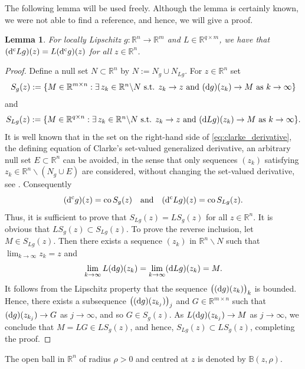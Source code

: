\documentclass[a4paper,11pt]{article}
\newcommand{\B}{\mathbb B}
\newcommand{\R}{\mathbb R}
\numberwithin{equation}{section}
\numberwithin{figure}{section}
\numberwithin{table}{section}
\newtheorem{lemma}[theorem]{Lemma}
\begin{document}
The following lemma will be used freely. Although the lemma is certainly known, we were not able to find a reference, and hence, we will give a proof.
\begin{lemma}\label{lem:Lg}
For locally Lipschitz $g:\R^n\to\R^m$ and $L\in\R^{q\times m}$, we have that
$({\rm d}^{\rm c}Lg)(z)=L({\rm d}^{\rm c}g)(z)$ for all $z\in\R^n$.
\end{lemma}
%
\begin{proof} Define a null set $N\subset\R^n$ by $N:=N_g\cup N_{Lg}$. For $z\in\R^n$ set
\[
S_g(z):=\{M\in\R^{m\times n}:\mbox{$\exists\,z_k\in\R^n\backslash N$ s.t.
$z_k\to z$ and $({\rm d}g)(z_k)\to M$ as $k\to\infty$}\}
\]
and
\[
S_{Lg}(z):=\{M\in\R^{q\times n}:\mbox{$\exists\,z_k\in\R^n\backslash N$ s.t.
$z_k\to z$ and $({\rm d}Lg)(z_k)\to M$ as $k\to\infty$}\}.
\]
It is well known that in the set on the right-hand side of \eqref{eq:clarke_derivative},
the defining equation of Clarke's set-valued generalized derivative,
an arbitrary null set $E\subset\R^n$ can be avoided, in the sense that only sequences
$(z_k)$ satisfying $z_k\in\R^n\backslash (N_g\cup E)$ are considered, without changing
the set-valued derivative, see \cite[Theorem 8.1, Chapter 2 and p.\ 133]{clsw98}. Consequently
\[
({\rm d}^{\rm c}g)(z)={\rm co}\,S_g(z)\quad\mbox{and}\quad({\rm d}^{\rm c}Lg)(z)={\rm co}\,S_{Lg}(z).
\]
Thus, it is sufficient to prove that $S_{Lg}(z)=LS_g(z)$ for all $z\in\R^n$. It is obvious that
$LS_g(z)\subset S_{Lg}(z)$. To prove the reverse inclusion, let $M\in S_{Lg}(z)$. Then there exists
a sequence $(z_k)$ in $\R^n\backslash N$ such that $\lim_{k\to\infty}z_k=z$ and
\[
\lim_{k\to\infty}L({\rm d}g)(z_k)=\lim_{k\to\infty}({\rm d}Lg)(z_k)=M.
\]
It follows from the Lipschitz property that the sequence $\big(({\rm d}g)(z_k)\big)_k$ is bounded. Hence, there exists a subsequence $\big(({\rm d}g)(z_{k_j})\big)_j$ and $G\in\R^{m\times n}$ such that
$({\rm d}g)(z_{k_j})\to G$ as $j\to\infty$, and so $G\in S_g(z)$. As $L({\rm d}g)(z_{k_j})\to M$
as $j\to\infty$, we conclude that $M=LG\in LS_g(z)$, and hence, $S_{Lg}(z)\subset LS_g(z)$, completing the proof.
\end{proof}
%
The open ball in $\R^n$ of radius $\rho>0$ and centred at $z$ is denoted by
$\B(z,\rho)$.
%
\end{document}
